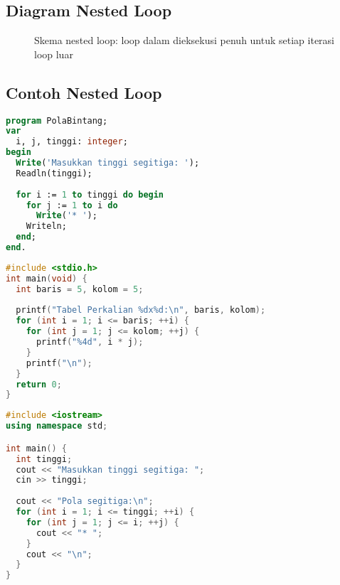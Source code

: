 \documentclass[../main.tex]{subfiles}
\begin{document}
\subsection{Diagram Nested Loop}
\begin{figure}[H]
  \centering
  \caption{Skema nested loop: loop dalam dieksekusi penuh untuk setiap iterasi loop luar}
\end{figure}

\subsection{Contoh Nested Loop}
\begin{lstlisting}[language=Pascal, caption={Pola segitiga dengan nested loop (Pascal)}]
program PolaBintang;
var
  i, j, tinggi: integer;
begin
  Write('Masukkan tinggi segitiga: ');
  Readln(tinggi);
  
  for i := 1 to tinggi do begin
    for j := 1 to i do
      Write('* ');
    Writeln;
  end;
end.
\end{lstlisting}

\begin{lstlisting}[language=C, caption={Tabel perkalian dengan nested loop (C)}]
#include <stdio.h>
int main(void) {
  int baris = 5, kolom = 5;
  
  printf("Tabel Perkalian %dx%d:\n", baris, kolom);
  for (int i = 1; i <= baris; ++i) {
    for (int j = 1; j <= kolom; ++j) {
      printf("%4d", i * j);
    }
    printf("\n");
  }
  return 0;
}
\end{lstlisting}

\begin{lstlisting}[language=C++, caption={Pola bintang dengan nested loop (C++)}]
#include <iostream>
using namespace std;

int main() {
  int tinggi;
  cout << "Masukkan tinggi segitiga: ";
  cin >> tinggi;
  
  cout << "Pola segitiga:\n";
  for (int i = 1; i <= tinggi; ++i) {
    for (int j = 1; j <= i; ++j) {
      cout << "* ";
    }
    cout << "\n";
  }
}
\end{lstlisting}
\end{document}
